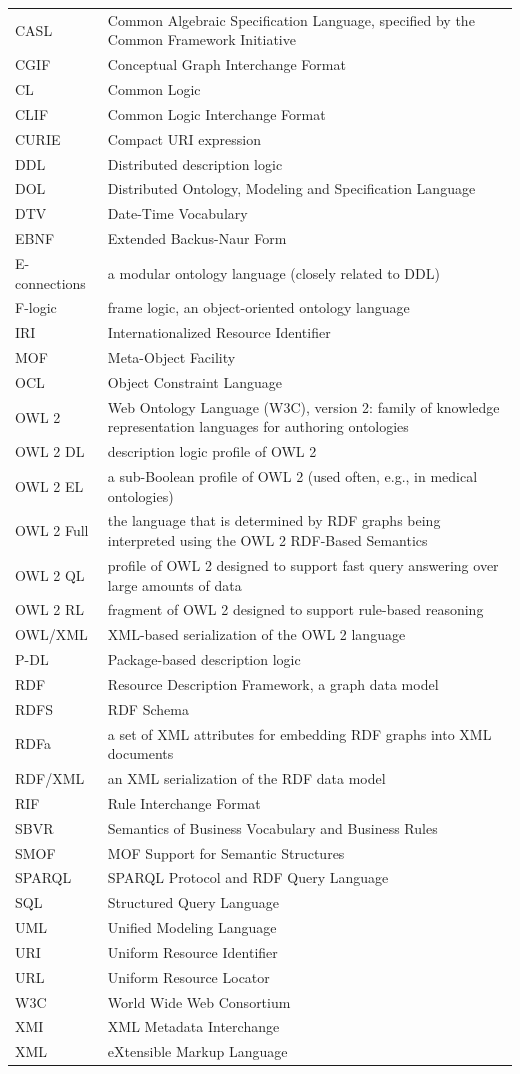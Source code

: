 \documentclass[10pt, a4paper]{isov2}
\renewenvironment{symbols}[0]{\begin{longtable}{p{.15\textwidth}p{.84\textwidth}}}{\end{longtable}}
\renewcommand{\symboldef}[2]{ #1 & #2 \\}
\begin{document}
\begin{symbols}
\symboldef{CASL}{Common Algebraic Specification Language, specified by the Common Framework Initiative}
\symboldef{CGIF}{Conceptual Graph Interchange Format}
\symboldef{CL}{Common Logic }
\symboldef{CLIF}{Common Logic Interchange Format}
\symboldef{CURIE}{Compact URI expression}
\symboldef{DDL}{Distributed description logic \cite{borgida6}}
\symboldef{DOL}{Distributed Ontology, Modeling and Specification Language}
\symboldef{DTV}{Date-Time Vocabulary}
\symboldef{EBNF}{Extended Backus-Naur Form}
\symboldef{E-connections}{a modular ontology language (closely related to DDL) \cite{Kutzetal04}}
\symboldef{F-logic}{frame logic, an object-oriented ontology language}
\symboldef{IRI}{Internationalized Resource Identifier}
\symboldef{MOF}{Meta-Object Facility}
\symboldef{OCL}{Object Constraint Language}
\symboldef{OWL 2}{Web Ontology Language (W3C), version 2: family of knowledge representation languages for authoring ontologies}
\symboldef{OWL 2 DL}{description logic profile of OWL 2}
\symboldef{OWL 2 EL}{a sub-Boolean profile of OWL 2 (used often, e.g.,  in medical ontologies)}
\symboldef{OWL 2 Full}{the language that is determined by RDF graphs being interpreted
using the OWL 2 RDF-Based Semantics \cite{W3C:owl2-rdf-based-semantics}}
\symboldef{OWL 2 QL}{profile of OWL 2 designed to support fast query answering over large amounts of data}
\symboldef{OWL 2 RL}{fragment of OWL 2 designed to support rule-based reasoning}
\symboldef{OWL/XML}{XML-based serialization of the OWL 2 language}
\symboldef{P-DL}{Package-based description logic}
\symboldef{RDF}{Resource Description Framework, a graph data model}
\symboldef{RDFS}{RDF Schema}
\symboldef{RDFa}{a set of XML attributes for embedding RDF graphs into XML documents}
\symboldef{RDF/XML}{an XML serialization of the RDF data model}
\symboldef{RIF}{Rule Interchange Format}
\symboldef{SBVR}{Semantics of Business Vocabulary and Business Rules}
\symboldef{SMOF}{MOF Support for Semantic Structures}
\symboldef{SPARQL}{SPARQL Protocol and RDF Query Language}
\symboldef{SQL}{Structured Query Language}
\symboldef{UML}{Unified Modeling Language}
\symboldef{URI}{Uniform Resource Identifier}
\symboldef{URL}{Uniform Resource Locator}
\symboldef{W3C}{World Wide Web Consortium}
\symboldef{XMI}{XML Metadata Interchange}
\symboldef{XML}{eXtensible Markup Language}
\end{symbols}

\end{document}
